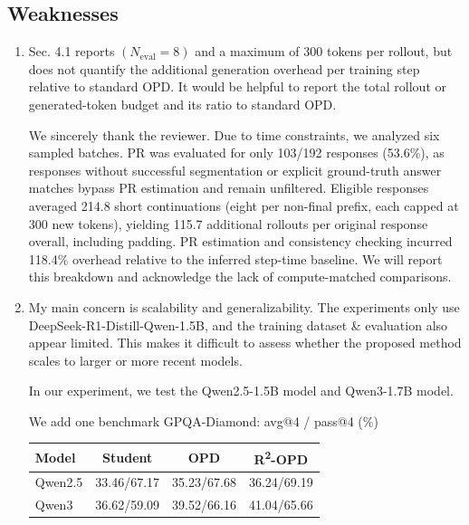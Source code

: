 \subsection*{Weaknesses}
\begin{enumerate}
\item Sec. 4.1 reports $(N_{\mathrm{eval}}=8)$ and a maximum of 300 tokens per rollout, but does not quantify the additional generation overhead per training step relative to standard OPD. It would be helpful to report the total rollout or generated-token budget and its ratio to standard OPD.
\par{}
\begin{responsebox}[frametitle={Response to W1}]
We sincerely thank the reviewer. Due to time constraints, we analyzed six sampled batches. PR was evaluated for only 103/192 responses (53.6\%), as responses without successful segmentation or explicit ground-truth answer matches bypass PR estimation and remain unfiltered. Eligible responses averaged 214.8 short continuations (eight per non-final prefix, each capped at 300 new tokens), yielding 115.7 additional rollouts per original response overall, including padding. PR estimation and consistency checking incurred 118.4\% overhead relative to the inferred step-time baseline. We will report this breakdown and acknowledge the lack of compute-matched comparisons.
\end{responsebox}

\item My main concern is scalability and generalizability. The experiments only use DeepSeek-R1-Distill-Qwen-1.5B, and the training dataset \& evaluation also appear limited. This makes it difficult to assess whether the proposed method scales to larger or more recent models.
\par{}
\begin{responsebox}[frametitle={Response to W2}]

In our experiment, we test the Qwen2.5-1.5B model and Qwen3-1.7B model. 

We add one benchmark GPQA-Diamond: avg@4 / pass@4 (\%)

\begin{center}
\begin{tabular}{lccc}
\hline
Model & Student & OPD & R\textsuperscript{2}-OPD \\
\hline
Qwen2.5 & 33.46/67.17 & 35.23/67.68 & 36.24/69.19 \\
Qwen3 & 36.62/59.09 & 39.52/66.16 & 41.04/65.66 \\
\hline
\end{tabular}
\end{center}


\end{responsebox}
\end{enumerate}
